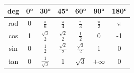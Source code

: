 \documentclass[a4paper,10pt]{article}
\begin{document}
\begin{mainbox}{}
  \begin{center} 
   \begin{tabular}{c|cccccc}
    deg & 0° & 30° & 45° & 60° & 90° & 180° \\
    \midrule
    rad & 0 & $\frac{\pi}{6}$ & $\frac{\pi}{4}$ & $\frac{\pi}{3}$ & $\frac{\pi}{2}$ & $\pi$ \\
    cos & 1 & $\frac{\sqrt{3}}{2}$ & $\frac{\sqrt{2}}{2}$ & $\frac{1}{2}$ & 0 & -1 \\
    sin & 0 & $\frac{1}{2}$ & $\frac{\sqrt{2}}{2}$ & $\frac{\sqrt{3}}{2}$ & 1 & 0 \\
    tan & 0 & $\frac{1}{\sqrt{3}}$ & 1 & $\sqrt{3}$ & $+\infty$ & 0 \\
   \end{tabular}
  \end{center}
\end{mainbox}
\end{document}
